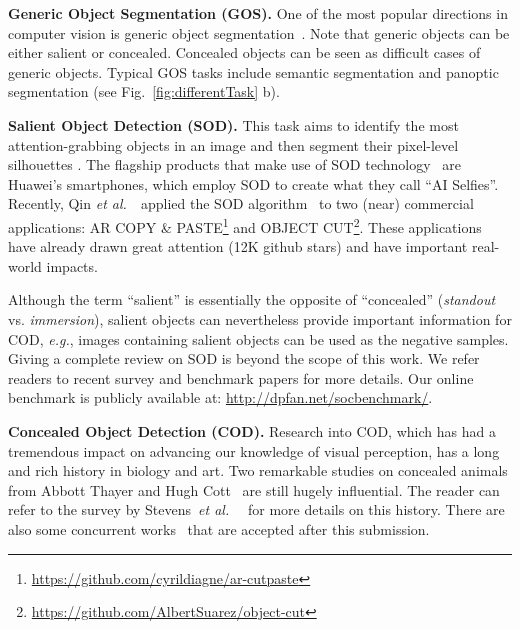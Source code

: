 \documentclass[10pt,journal,compsoc]{IEEEtran}
\def\eg{\emph{e.g.}}
\def\etal{{\em et al.~}}
\newcommand{\myPara}[1]{\vspace{6pt}\noindent\textbf{#1}\qquad }
\newcommand{\figref}[1]{Fig.~\ref{#1}}
\begin{document}
\myPara{Generic Object Segmentation (GOS).}
%
One of the most popular directions in computer vision is generic object 
segmentation~\cite{shotton2006textonboost,liu2010sift,
everingham2015pascal,kirillov2019panoptic}.
%
Note that generic objects can be either salient or concealed.
Concealed objects can be seen as difficult cases of generic objects. 
Typical GOS tasks include semantic segmentation and panoptic segmentation 
(see \figref{fig:differentTask} b). 


\myPara{Salient Object Detection (SOD).}
This task aims to identify the most attention-grabbing objects
in an image and then segment their pixel-level silhouettes
\cite{itti1998model,ChengPAMI,GaoEccv20Sal100K}.
%
The flagship products that make use of SOD technology~\cite{HouPami19Dss} are 
Huawei's smartphones, 
which employ SOD \cite{HouPami19Dss} to create what they call ``AI Selfies''. 
%
Recently, Qin \etal~applied the SOD algorithm~\cite{qin2021BAS} to two (near)
commercial applications: AR COPY \& PASTE\footnote{
\url{https://github.com/cyrildiagne/ar-cutpaste}} 
and OBJECT CUT\footnote{\url{https://github.com/AlbertSuarez/object-cut}}.
These applications have already drawn great attention 
(12K github stars) and have important real-world impacts.

Although the term ``salient'' is essentially the opposite of ``concealed'' 
(\emph{standout} vs. \emph{immersion}),
salient objects can nevertheless provide important information for COD,
\eg, images containing salient objects can be used as the negative samples.
%
Giving a complete review on SOD is beyond the scope of this work. 
We refer readers to recent survey and benchmark papers
\cite{Fan2021SOC,borji2015salient,wang2019salient,BorjiCVM2019} 
for more details. Our online benchmark is publicly available at: 
\url{http://dpfan.net/socbenchmark/}. 


\myPara{Concealed Object Detection (COD).}
Research into COD, which has had a tremendous impact on advancing our knowledge of 
visual perception, has a long and rich history in biology and art.
%
Two remarkable studies on concealed animals from Abbott Thayer
\cite{thayer1909concealing} and Hugh Cott~\cite{cott1940adaptive}
are still hugely influential. 
The reader can refer to the survey by Stevens~\etal~\cite{stevens2008animal} 
for more details on this history. 
There are also some concurrent works~\cite{zhai2021Mutual,Lyu2021Mutual,mei2021Ming} 
that are accepted after this submission.
\end{document}
